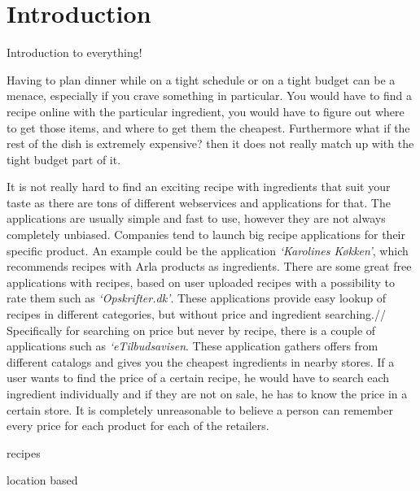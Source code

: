 \section{Introduction}
\label{sec:intro}

Introduction to everything!


Having to plan dinner while on a tight schedule or on a tight budget can be a menace, especially if you crave something in particular. You would have to find a recipe online with the particular ingredient, you would have to figure out where to get those items, and where to get them the cheapest. Furthermore what if the rest of the dish is extremely expensive? then it does not really match up with the tight budget part of it.

It is not really hard to find an exciting recipe with ingredients that suit your taste as there are tons of different webservices and applications for that. The applications are usually simple and fast to use, however they are not always completely unbiased. Companies tend to launch big recipe applications for their specific product. An example could be the application \emph{`Karolines Køkken'}\cite{arla}, which recommends recipes with Arla products as ingredients. There are some great free applications with recipes, based on user uploaded recipes with a possibility to rate them such as \emph{`Opskrifter.dk'}\cite{opskrifterdk}. These applications provide easy lookup of recipes in different categories, but without price and ingredient searching.//
Specifically for searching on price but never by recipe, there is a couple of applications such as \emph{`eTilbudsavisen}\cite{etilbudsavisen}. These application gathers offers from different catalogs and gives you the cheapest ingredients in nearby stores. If a user wants to find the price of a certain recipe, he would have to search each ingredient individually and if they are not on sale, he has to know the price in a certain store. It is completely unreasonable to believe a person can remember every price for each product for each of the retailers.





recipes

location based
